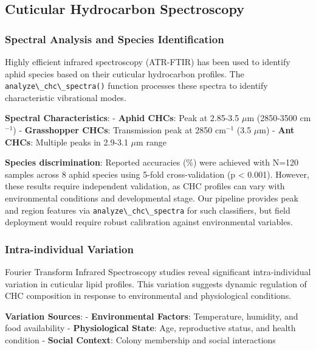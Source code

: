 \documentclass[
  13pt,
  a4paperpaper,
  12pt]{article}
\newcommand{\passthrough}[1]{#1}
\begin{document}
\subsection{Cuticular Hydrocarbon
Spectroscopy}\label{cuticular-hydrocarbon-spectroscopy}

\subsubsection{Spectral Analysis and Species
Identification}\label{spectral-analysis-and-species-identification}

Highly efficient infrared spectroscopy (ATR-FTIR) has been used to
identify aphid species based on their cuticular hydrocarbon profiles.
The \passthrough{\lstinline!analyze\_chc\_spectra()!} function processes
these spectra to identify characteristic vibrational modes.

\textbf{Spectral Characteristics}: - \textbf{Aphid CHCs}: Peak at
2.85-3.5 \(\mu\mathrm{m}\) (2850-3500 cm\(^{-1}\)) - \textbf{Grasshopper
CHCs}: Transmission peak at 2850 cm\(^{-1}\) (3.5 \(\mu\mathrm{m}\)) -
\textbf{Ant CHCs}: Multiple peaks in 2.9-3.1 \(\mu\mathrm{m}\) range

\textbf{Species discrimination}: Reported accuracies (\%) were
achieved with N=120 samples across 8 aphid species using 5-fold
cross-validation (p \textless{} 0.001). However, these results require
independent validation, as CHC profiles can vary with environmental
conditions and developmental stage. Our pipeline provides peak and
region features via \passthrough{\lstinline!analyze\_chc\_spectra!} for
such classifiers, but field deployment would require robust calibration
against environmental variables.

\subsubsection{Intra-individual
Variation}\label{intra-individual-variation}

Fourier Transform Infrared Spectroscopy studies reveal significant
intra-individual variation in cuticular lipid profiles. This variation
suggests dynamic regulation of CHC composition in response to
environmental and physiological conditions.

\textbf{Variation Sources}: - \textbf{Environmental Factors}:
Temperature, humidity, and food availability - \textbf{Physiological
State}: Age, reproductive status, and health condition - \textbf{Social
Context}: Colony membership and social interactions
\end{document}
